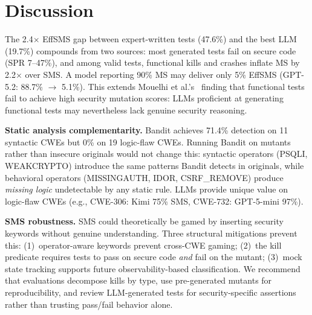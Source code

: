 \documentclass[sigconf,anonymous,review]{acmart}
\begin{document}
\smallskip\noindent{}\smallskip


\section{Discussion}\label{sec:discussion}

The 2.4$\times$ EffSMS gap between expert-written tests (47.6\%) and the best LLM (19.7\%) compounds from two sources: most generated tests fail on secure code (SPR 7--47\%), and among valid tests, functional kills and crashes inflate MS by 2.2$\times$ over SMS. A model reporting 90\% MS may deliver only 5\% EffSMS (GPT-5.2: 88.7\% $\rightarrow$ 5.1\%). This extends Mouelhi et al.'s~\cite{mouelhi2007mutation} finding that functional tests fail to achieve high security mutation scores: LLMs proficient at generating functional tests may nevertheless lack genuine security reasoning.

\textbf{Static analysis complementarity.} Bandit achieves 71.4\% detection on 11 syntactic CWEs but 0\% on 19 logic-flaw CWEs. Running Bandit on mutants rather than insecure originals would not change this: syntactic operators (PSQLI, WEAKCRYPTO) introduce the same patterns Bandit detects in originals, while behavioral operators (MISSINGAUTH, IDOR, CSRF\_REMOVE) produce \emph{missing logic} undetectable by any static rule. LLMs provide unique value on logic-flaw CWEs (e.g., CWE-306: Kimi 75\% SMS, CWE-732: GPT-5-mini 97\%).

\textbf{SMS robustness.} SMS could theoretically be gamed by inserting security keywords without genuine understanding. Three structural mitigations prevent this: (1)~operator-aware keywords prevent cross-CWE gaming; (2)~the kill predicate requires tests to pass on secure code \emph{and} fail on the mutant; (3)~mock state tracking supports future observability-based classification. We recommend that evaluations decompose kills by type, use pre-generated mutants for reproducibility, and review LLM-generated tests for security-specific assertions rather than trusting pass/fail behavior alone.


\end{document}
